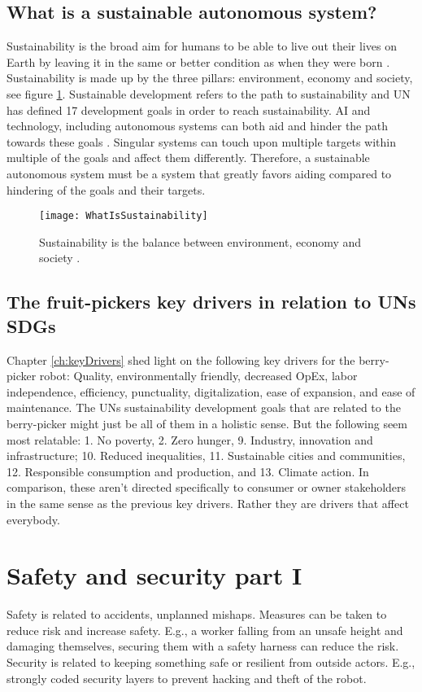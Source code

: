 \documentclass[%
oneside,    %
project,    %
nosummary   %
]{USN-MSc}
\begin{document}
\section{What is a sustainable autonomous system?}
Sustainability is the broad aim for humans to be able to live out their lives on Earth by leaving it in the same or better condition as when they were born \cite{enwiki:1113015553}. Sustainability is made up by the three pillars: environment, economy and society, see figure \ref{fig:whatIsSus}. Sustainable development refers to the path to sustainability and UN has defined 17 development goals in order to reach sustainability. AI and technology, including autonomous systems can both aid and hinder the path towards these goals \cite{vinuesa2020role}. Singular systems can touch upon multiple targets within multiple of the goals and affect them differently. Therefore, a sustainable autonomous system must be a system that greatly favors aiding compared to hindering of the goals and their targets.

\begin{figure}[!ht]
  \centering
  \texttt{[image: WhatIsSustainability]}
  \caption{Sustainability is the balance between environment, economy and society \cite{enwiki:1113015553}.}
  \label{fig:whatIsSus}
\end{figure}

\section{The fruit-pickers key drivers in relation to UNs SDGs}
Chapter \ref{ch:keyDrivers} shed light on the following key drivers for the berry-picker robot: Quality, environmentally friendly, decreased OpEx, labor independence, efficiency, punctuality, digitalization, ease of expansion, and ease of maintenance.
The UNs sustainability development goals that are related to the berry-picker might just be all of them in a holistic sense. But the following seem most relatable: 1. No poverty, 2. Zero hunger, 9. Industry, innovation and infrastructure; 10. Reduced inequalities, 11. Sustainable cities and communities, 12. Responsible consumption and production, and 13. Climate action.
In comparison, these aren't directed specifically to consumer or owner stakeholders in the same sense as the previous key drivers. Rather they are drivers that affect everybody.

\chapter{Safety and security part I}
\label{ch:safety1}
Safety is related to accidents, unplanned mishaps. Measures can be taken to reduce risk and increase safety. E.g., a worker falling from an unsafe height and damaging themselves, securing them with a safety harness can reduce the risk.
Security is related to keeping something safe or resilient from outside actors. E.g., strongly coded security layers to prevent hacking and theft of the robot.
\end{document}
